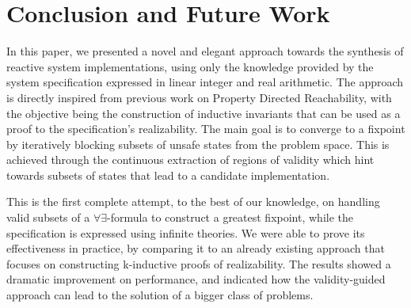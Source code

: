 \section{Conclusion and Future Work}
\label{sec:conclusion}

In this paper, we presented a novel and elegant approach towards the synthesis
of reactive system implementations, using only the knowledge provided by the
system specification expressed in linear integer and real arithmetic. The approach is
directly inspired from previous work on Property Directed Reachability, with the objective being the construction of inductive
invariants that can be used as a proof to the specification's realizability. The
main goal is to converge to a fixpoint by iteratively blocking subsets of
unsafe states from the problem space. This is achieved through the continuous
extraction of regions of validity which hint towards subsets of states that
lead to a candidate implementation.

This is the first complete attempt, to the best of our knowledge, on handling
valid subsets of a $\forall\exists$-formula to construct a greatest fixpoint,
while the specification is expressed using infinite theories. We were able to
prove its effectiveness in practice, by comparing it to an already existing
approach that focuses on constructing k-inductive proofs of realizability. The
results showed a dramatic improvement on performance, and indicated how the
validity-guided approach can lead to the solution of a bigger class of problems.

